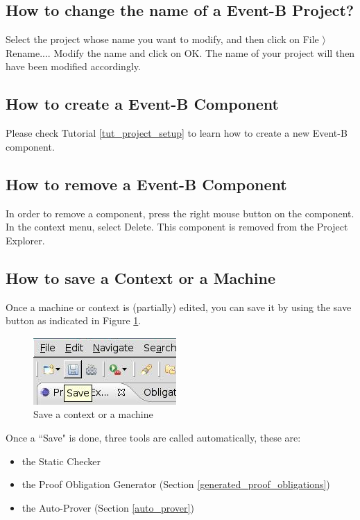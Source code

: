 \subsection{How to change the name of a Event-B Project?}

Select the project whose name you want to modify, and then click on \textsf{File $\rangle$ Rename...}. Modify the name and click on \textsf{OK}. The name of your project will then have been modified accordingly. 

\subsection{How to create a Event-B Component}

Please check Tutorial \ref{tut_project_setup} to learn how to create a new Event-B component.

\subsection{How to remove a Event-B Component}

In order to remove a component, press the right mouse button on the component. In the context menu, select \textsf{Delete}. This component is removed from the \textsf{Project Explorer}. 

\subsection{How to save a Context or a Machine}

Once a machine or context is (partially) edited, you can save it by using the save button as indicated in Figure \ref{fig_faq_saveaction}.

\begin{figure}[!ht]
\begin{center}
	\includegraphics{img/faq/faq_saveaction.png}
	\caption{Save a context or a machine}
	\label{fig_faq_saveaction}
\end{center}
\end{figure}

Once a ``Save" is done, three tools are called automatically, these are:

\begin{itemize}
	\item the Static Checker
	\item the Proof Obligation Generator (Section \ref{generated_proof_obligations})
	\item the Auto-Prover (Section \ref{auto_prover})
\end{itemize}


